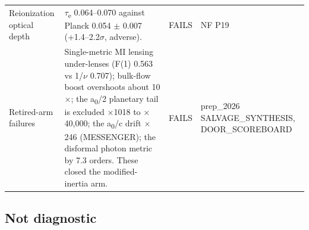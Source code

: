 \documentclass[10pt]{article}
\begin{document}
{\begin{longtable}{>{\raggedright\arraybackslash}p{4.4cm}>{\raggedright\arraybackslash}p{11.6cm}>{\raggedright\arraybackslash}p{2.0cm}>{\raggedright\arraybackslash}p{3.4cm}}
Reionization optical depth & \ensuremath{\tau}\textsubscript{e} 0.064--0.070 against Planck 0.054 \ensuremath{\pm} 0.007 (+1.4--2.2\ensuremath{\sigma}, adverse). & FAILS & NF P19 \\
Retired-arm failures & Single-metric MI lensing under-lenses (F(1) 0.563 vs 1/\ensuremath{\nu} 0.707); bulk-flow boost overshoots about 10\ensuremath{\times}; the a\textsubscript{0}/2 planetary tail is excluded \ensuremath{\times}1018 to \ensuremath{\times}40,000; the a\textsubscript{0}/c drift \ensuremath{\times}246 (MESSENGER); the disformal photon metric by 7.3 orders. These closed the modified-inertia arm. & FAILS & prep\_2026 SALVAGE\_SYNTHESIS, DOOR\_SCOREBOARD \\
\bottomrule\end{longtable}}

\subsection*{Not diagnostic}
\end{document}
